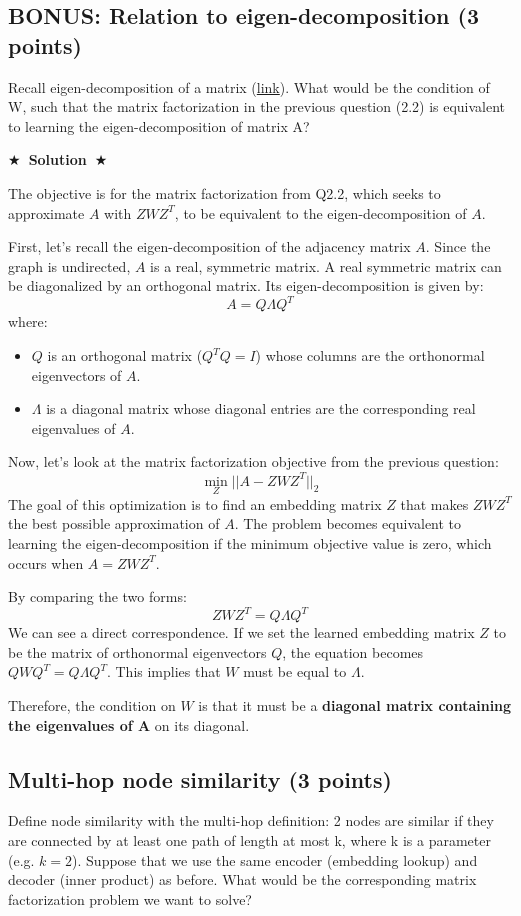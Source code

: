 \documentclass{article}
\numberwithin{figure}{section}
\newcommand{\Solution}[1]{%
	{%
		\medskip
		\color{red}
		\bf $\bigstar$~\sf\textbf{Solution}~$\bigstar$ \sf
		#1
	}
	\bigskip
}
\begin{document}
	
	
	\subsection{BONUS: Relation to eigen-decomposition (3 points)}
	Recall eigen-decomposition of a matrix (\href{https://en.wikipedia.org/wiki/Eigendecomposition_of_a_matrix}{link}). What would be the condition of W, such that the matrix factorization in the previous question (2.2) is equivalent to learning the eigen-decomposition of matrix A?
	
	\Solution{
		The objective is for the matrix factorization from Q2.2, which seeks to approximate $A$ with $Z W Z^T$, to be equivalent to the eigen-decomposition of $A$.
		
		First, let's recall the eigen-decomposition of the adjacency matrix $A$. Since the graph is undirected, $A$ is a real, symmetric matrix. A real symmetric matrix can be diagonalized by an orthogonal matrix. Its eigen-decomposition is given by:
		\[ A = Q \Lambda Q^T \]
		where:
		\begin{itemize}
			\item $Q$ is an orthogonal matrix ($Q^T Q = I$) whose columns are the orthonormal eigenvectors of $A$.
			\item $\Lambda$ is a diagonal matrix whose diagonal entries are the corresponding real eigenvalues of $A$.
		\end{itemize}
		
		Now, let's look at the matrix factorization objective from the previous question:
		\[ \min_Z ||A - Z W Z^T||_2 \]
		The goal of this optimization is to find an embedding matrix $Z$ that makes $Z W Z^T$ the best possible approximation of $A$. The problem becomes equivalent to learning the eigen-decomposition if the minimum objective value is zero, which occurs when $A = Z W Z^T$.
		
		By comparing the two forms:
		\[ Z W Z^T = Q \Lambda Q^T \]
		We can see a direct correspondence. If we set the learned embedding matrix $Z$ to be the matrix of orthonormal eigenvectors $Q$, the equation becomes $Q W Q^T = Q \Lambda Q^T$. This implies that $W$ must be equal to $\Lambda$.
		
		Therefore, the condition on $W$ is that it must be a \textbf{diagonal matrix containing the eigenvalues of A} on its diagonal.
	}
	
	\subsection{Multi-hop node similarity (3 points)}
	Define node similarity with the multi-hop definition: 2 nodes are similar if they are connected by at least one path of length at most k, where k is a parameter (e.g. $k = 2$). Suppose that we use the same encoder (embedding lookup) and decoder (inner product) as before. What would be the corresponding matrix factorization problem we want to solve?
	
\end{document}
